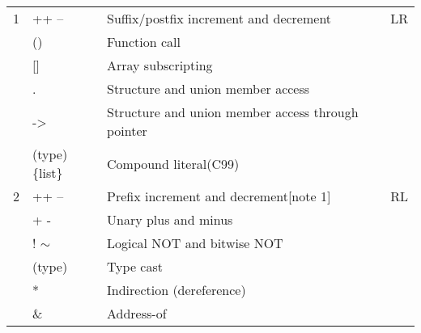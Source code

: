 \documentclass{extarticle}
\begin{document}
\begin{multicols}{2}
\begin{tabular}{|l|l|l|l|}
\hline
     &                                               &                                                             &  \\ \hline
1              & ++ --                                                 & Suffix/postfix increment and decrement                                 & LR            \\
               & ()                                                    & Function call                                                          &               \\
               & {[}{]}                                                & Array subscripting                                                     &               \\
               & .                                                     & Structure and union member access                                      &               \\
               & -\textgreater{}                                       & Structure and union member access through pointer                      &               \\
               & (type)\{list\}                                        & Compound literal(C99)                                                  &               \\ \hline
2              & ++ --                                                 & Prefix increment and decrement{[}note 1{]}                             & RL            \\
               & + -                                                   & Unary plus and minus                                                   &               \\
               & ! $\sim$                                              & Logical NOT and bitwise NOT                                            &               \\
               & (type)                                                & Type cast                                                              &               \\
               & *                                                     & Indirection (dereference)                                              &               \\
               & \&                                                    & Address-of                                                             &               \\

\end{tabular}
\end{multicols}
\end{document}

